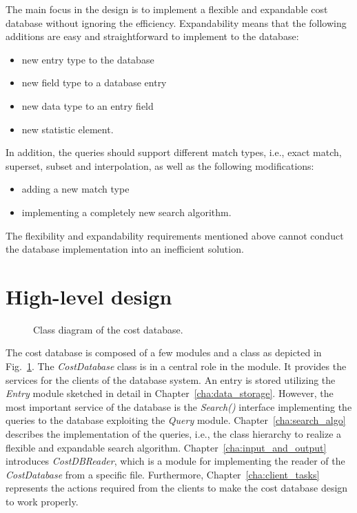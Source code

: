 \documentclass[a4paper,twoside]{tce}
\begin{document}
The main focus in the design is to implement a flexible and expandable
cost database without ignoring the efficiency. Expandability means
that the following additions are easy and straightforward to implement
to the database:
\begin{itemize}
\item new entry type to the database
\item new field type to a database entry
\item new data type to an entry field
\item new statistic element.
\end{itemize}
In addition, the queries should support different match types, i.e.,
exact match, superset, subset and interpolation, as well as the
following modifications:
\begin{itemize}
\item adding a new match type
\item implementing a completely new search algorithm.
\end{itemize}
The flexibility and expandability requirements mentioned above cannot
conduct the database implementation into an inefficient solution.

\section{High-level design}
\label{sec:database_implem}

\begin{figure}[tb]
\centerline{}
\caption{Class diagram of the cost database.}
\label{fig:class_database}
\end{figure}

The cost database is composed of a few modules and a class as
depicted in Fig.~\ref{fig:class_database}. The \emph{CostDatabase}
class is in a central role in the module. It provides the services for
the clients of the database system. An entry is stored utilizing the
\emph{Entry} module sketched in detail in
Chapter~\ref{cha:data_storage}. However, the most important service of
the database is the \emph{Search()} interface implementing the queries
to the database exploiting the \emph{Query} module.
Chapter~\ref{cha:search_algo} describes the implementation of the
queries, i.e., the class hierarchy to realize a flexible and
expandable search algorithm. Chapter~\ref{cha:input_and_output}
introduces \emph{CostDBReader}, which is a module for implementing the
reader of the \emph{CostDatabase} from a specific file. Furthermore,
Chapter~\ref{cha:client_tasks} represents the actions required from
the clients to make the cost database design to work properly.
\end{document}
